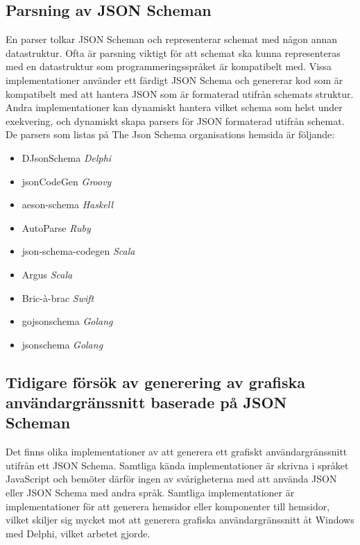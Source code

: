 \subsection{Parsning av JSON Scheman}
\label{sec:teori:schema-användningsområden:parsning}
En parser tolkar JSON Scheman och representerar schemat med någon annan datastruktur. Ofta är parsning viktigt för att schemat ska kunna representeras med en datastruktur som programmeringsspråket är kompatibelt med. Vissa implementationer använder ett färdigt JSON Schema och genererar kod som är kompatibelt med att hantera JSON som är formaterad utifrån schemats struktur. Andra implementationer kan dynamiskt hantera vilket schema som helst under exekvering, och dynamiskt skapa parsers för JSON formaterad utifrån schemat. De parsers som listas på The Json Schema organisations hemsida är följande:

\begin{itemize}
	\item DJsonSchema \textit{Delphi} \cite{Schlothauer&WauerGmbH}
	\item jsonCodeGen \textit{Groovy} \cite{Schlothauer&WauerGmbHa}
	\item aeson-schema \textit{Haskell} \cite{Kowalczyk}
	\item AutoParse \textit{Ruby} \cite{Googleb}
	\item json-schema-codegen \textit{Scala} \cite{Tundra}
	\item Argus \textit{Scala} \cite{Fenton}
	\item Bric-à-brac \textit{Swift} \cite{GlimpseI/OInc}
	\item gojsonschema \textit{Golang} \cite{Zhangtao}
	\item jsonschema \textit{Golang} \cite{Qriinc.}
\end{itemize}

\subsection{Tidigare försök av generering av grafiska användargränssnitt baserade på JSON Scheman}
\label{sec:teori:schema-användningsområden:ui-generering}
Det finns olika implementationer av att generera ett grafiskt användargränssnitt utifrån ett JSON Schema. Samtliga kända implementationer är skrivna i språket JavaScript och bemöter därför ingen av svårigheterna med att använda JSON eller JSON Schema med andra språk. Samtliga implementationer är implementationer för att generera hemsidor eller komponenter till hemsidor, vilket skiljer sig mycket mot att generera grafiska användargränssnitt åt Windows med Delphi, vilket arbetet gjorde.

